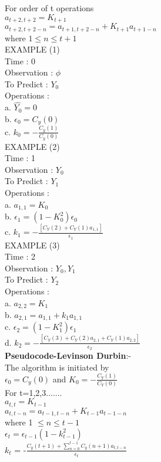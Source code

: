 \documentclass[11pt]{article}
\begin{document}
{For order of t operations \\
$a_{t+2,t+2} = K_{t+1}$\\
$a_{t+2,t+2-n} = a_{t+1,t+2-n} + K_{t+1}a_{t+1-n}$\\
where $1\leq n \leq t+1$\\

EXAMPLE (1)\\
Time : 0\\
Observation : $\phi$\\
To Predict : $Y_0$\\
Operations :\\ 
a. $\hat{Y_0}=0$\\
b. $\epsilon_{0}=C_y(0)$\\
c. $k_0=-\frac{C_y(1)}{C_y(0)}$\\
    
EXAMPLE (2)\\ 
Time : 1\\
Observation : $Y_0$ \\ 
To Predict : $Y_1$\\
Operations :\\ 
a. $a_{1,1} = K_0$\\
b. $\epsilon_1 = (1-K_0^2)\epsilon_0$\\
c. $k_1 = -\frac{[C_Y(2) + C_Y(1)a_{1,1}]}{\epsilon_1}$\\

EXAMPLE (3)\\
Time : 2\\
Observation : $Y_0,Y_1$ \\
To Predict : $Y_2$\\
Operations :  \\
a. $a_{2,2} = K_1$\\
b. $a_{2,1} = a_{1,1} + k_1a_{1,1}$\\
c. $\epsilon_2 = (1-K_1^2)\epsilon_1$\\
d. $k_2 = -\frac{[C_Y(3) + C_Y(2)a_{2,1} + C_Y(1)a_{2,2}]}{\epsilon_2}$\\


\textbf{Pseudocode-Levinson Durbin}:-\\

The algorithm is initiated by\\
$\epsilon_{0} = C_y(0)$ and $K_0 = -\frac{C_Y(1)}{C_Y(0)}$\\

For t=1,2,3.......\\
$a_{t,t} = K_{t-1}$\\
$a_{t,t-n} = a_{t-1,t-n} + K_{t-1}a_{t-1-n}$\\
where 1 $\leq n \leq t-1$\\
$\epsilon_t = \epsilon_{t-1}(1-k_{t-1}^2)$\\
$k_t$ = -$\frac{C_y(t+1) + \sum_{n=0}^{t-1}C_y(n+1)a_{t,t-n}}{\epsilon_t}$\\

}
\end{document}
